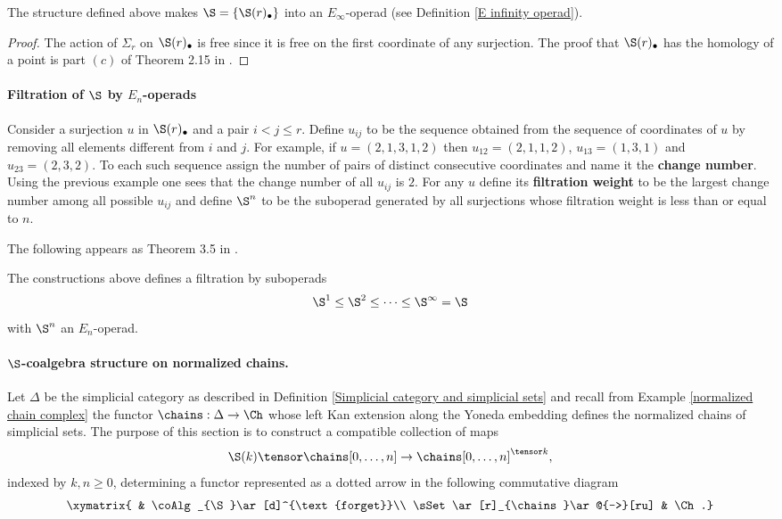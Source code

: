 \documentclass[main.tex]{subfiles}
\begin{document}
\begin{lemma}
The structure defined above makes $\S=\{\S(r)_\bullet\}$ into an $E_{\infty}$-operad (see Definition \ref{E infinity operad}).
\begin{proof}
The action of $\Sigma_r$ on $\S(r)_\bullet$ is free since it is free on the first coordinate of any surjection. The proof that $\S(r)_\bullet$ has the homology of a point is part $(c)$ of Theorem 2.15 in \cite{MS03}.
\end{proof}
\end{lemma}

\paragraph{Filtration of $\S$ by $E_n$-operads}

Consider a surjection $u$ in $\S(r)_\bullet$ and a pair $i<j\leq r$. Define $u_{ij}$ to be the sequence obtained from the sequence of coordinates of $u$ by removing all elements different from $i$ and $j$. For example, if $u=(2,1,3,1,2)$ then $u_{12}=(2,1,1,2)$, $u_{13}=(1,3,1)$ and $u_{23}=(2,3,2)$. To each such sequence assign the number of pairs of distinct consecutive coordinates and name it the \textbf{change number}. Using the previous example one sees that the change number of all $u_{ij}$ is $2$. For any $u$ define its \textbf{filtration weight} to be the largest change number among all possible $u_{ij}$ and define $\S^n$ to be the suboperad generated by all surjections whose filtration weight is less than or equal to $n$.

The following appears as Theorem 3.5 in \cite{MS03}.
\begin{lemma}\label{filtration by E_n}
The constructions above defines a filtration by suboperads
$$\S^1\leq\S^2\leq\dotsb\leq\S^\infty=\S$$
with $\S^n$ an $E_n$-operad.
\end{lemma}

\paragraph{$\S$-coalgebra structure on normalized chains.} Let $\Delta$ be the simplicial category as described in Definition \ref{Simplicial category and simplicial sets} and recall from Example \ref{normalized chain complex} the functor $\chains:\Delta\to\Ch$ whose left Kan extension along the Yoneda embedding defines the normalized chains of simplicial sets. The purpose of this section is to construct a compatible collection of maps
$$\S(k)\tensor\chains[0,\dotsc,n]\to\chains[0,\dotsc,n]^{\tensor k},$$
indexed by $k,n\geq0$, determining a functor represented as a dotted arrow in the following commutative diagram
$$\xymatrix{ & \coAlg_{\S}\ar[d]^{\text{forget}}\\ \sSet \ar[r]_{\chains}\ar@{-->}[ru] & \Ch.}$$
\end{document}
